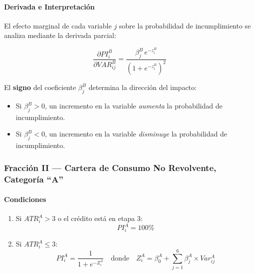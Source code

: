 \paragraph*{Derivada e Interpretación}

El efecto marginal de cada variable $j$ sobre la probabilidad de incumplimiento se analiza mediante la derivada parcial:

\begin{equation}
    \frac{\partial PI_i^B}{\partial VAR_{ij}^B} = \frac{\beta_j^B \, e^{-z_i^B}}{\left(1 + e^{-z_i^B}\right)^2}
\end{equation}

El \textbf{signo} del coeficiente $\beta_j^B$ determina la dirección del impacto:
\begin{itemize}
    \item Si $\beta_j^B > 0$, un incremento en la variable \textit{aumenta} la probabilidad de incumplimiento.
    \item Si $\beta_j^B < 0$, un incremento en la variable \textit{disminuye} la probabilidad de incumplimiento.
\end{itemize}

\subsubsection{Fracción II --- Cartera de Consumo No Revolvente, Categoría ``A''}

\paragraph*{Condiciones}

\begin{enumerate}[label=\alph*)]
    \item Si $ATR_i^A > 3$ o el crédito está en etapa 3:
        \begin{equation}
            PI_i^A = 100\%
        \end{equation}
    \item Si $ATR_i^A \leq 3$:
        \begin{equation}
            PI_i^A = \frac{1}{1 + e^{-Z_i^A}} \quad \text{donde} \quad Z_i^A = \beta_0^A + \sum_{j=1}^{6} \beta_j^A \times Var_{ij}^A
        \end{equation}
\end{enumerate}

